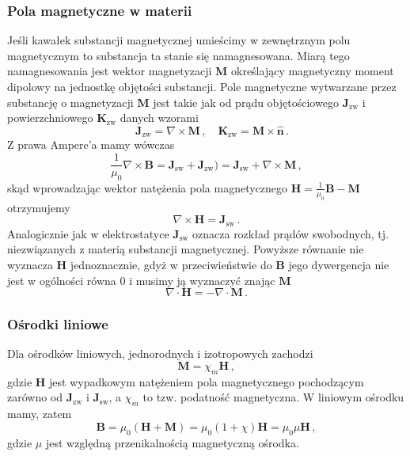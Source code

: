 \documentclass[../main.tex]{subfiles}
\begin{document}
\subsubsection{Pola magnetyczne w materii}
Jeśli kawałek substancji magnetycznej umieścimy w zewnętrznym polu magnetycznym to substancja ta stanie się namagnesowana. Miarą tego namagnesowania jest wektor magnetyzacji \(\mathbf{M}\) określający magnetyczny moment dipolowy na jednostkę objętości substancji. Pole magnetyczne wytwarzane przez substancję o magnetyzacji \(\mathbf{M}\) jest takie jak od prądu objętościowego \(\mathbf{J}_\text{zw}\) i powierzchniowego \(\mathbf{K}_\text{zw}\) danych wzorami
\begin{equation*}
  \quad\mathbf{J}_\text{zw}=\nabla\times\mathbf{M}\,,\quad\mathbf{K}_\text{zw}=\mathbf{M}\times\mathbf{\hat{n}}\,.
\end{equation*}
Z prawa Ampere'a mamy wówczas
\begin{equation*}
    \frac{1}{\mu_0}\nabla\times\mathbf{B}=\mathbf{J}_\text{sw}+\mathbf{J}_\text{zw})=\mathbf{J}_\text{sw}+\nabla\times\mathbf{M}\,,
\end{equation*}
skąd wprowadzając wektor natężenia pola magnetycznego \(\mathbf{H}=\frac{1}{\mu_0}\mathbf{B}-\mathbf{M}\) otrzymujemy
\begin{equation*}
    \nabla\times\mathbf{H}=\mathbf{J}_\text{sw}\,.
\end{equation*}
Analogicznie jak w elektrostatyce \(\mathbf{J}_\text{sw}\) oznacza rozkład prądów swobodnych, tj. niezwiązanych z materią substancji magnetycznej. Powyższe równanie nie wyznacza \(\mathbf{H}\) jednoznacznie, gdyż w przeciwieństwie do \(\mathbf{B}\) jego dywergencja nie jest w ogólności równa 0 i musimy ją wyznaczyć znając \(\mathbf{M}\)
\begin{equation*}
    \nabla\cdot\mathbf{H}=-\nabla\cdot\mathbf{M}\,.
\end{equation*}
\subsubsection*{Ośrodki liniowe}
Dla ośrodków liniowych, jednorodnych i izotropowych zachodzi
\begin{equation*}
    \mathbf{M}=\chi_m\mathbf{H}\,,
\end{equation*}
gdzie \(\mathbf{H}\) jest wypadkowym natężeniem pola magnetycznego pochodzącym zarówno od \(\mathbf{J}_\text{zw}\) i \(\mathbf{J}_\text{sw}\), a \(\chi_m\) to tzw. podatność magnetyczna. W liniowym ośrodku mamy, zatem
\begin{equation*}
    \mathbf{B}=\mu_0(\mathbf{H}+\mathbf{M})=\mu_0(1+\chi)\mathbf{H}=\mu_0\mu\mathbf{H}\,,
\end{equation*}
gdzie \(\mu\) jest względną przenikalnością magnetyczną ośrodka.
\end{document}
